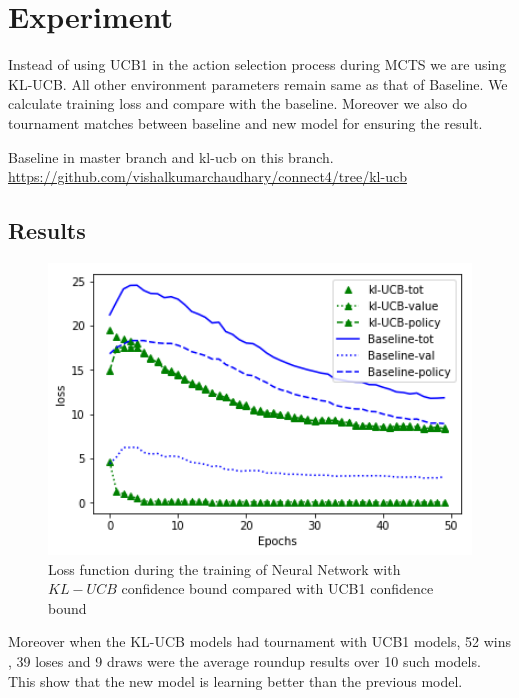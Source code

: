 \section{Experiment}
Instead of using UCB1 in the action selection process during MCTS we are using KL-UCB. All other environment parameters remain same as that of Baseline. We calculate training loss and compare with the baseline. Moreover we also do tournament matches between baseline and new model for ensuring the result.

Baseline in master branch and kl-ucb on this branch.\\
\url{https://github.com/vishalkumarchaudhary/connect4/tree/kl-ucb}

\subsection{Results}

\begin{figure}
 	[!htb]\centering
    \includegraphics[width=6in]{images/kl-ucbVSbaseline.png}
    \caption{Loss function during the training of Neural Network with $KL-UCB$ confidence bound compared with UCB1 confidence bound}
  \label{fig:phase}
  \end{figure}

Moreover when the KL-UCB models had tournament with UCB1 models, 52 wins , 39 loses and 9 draws were the average roundup  results over 10 such models. This show that the new model is learning  better  than the previous model.

\clearpage
